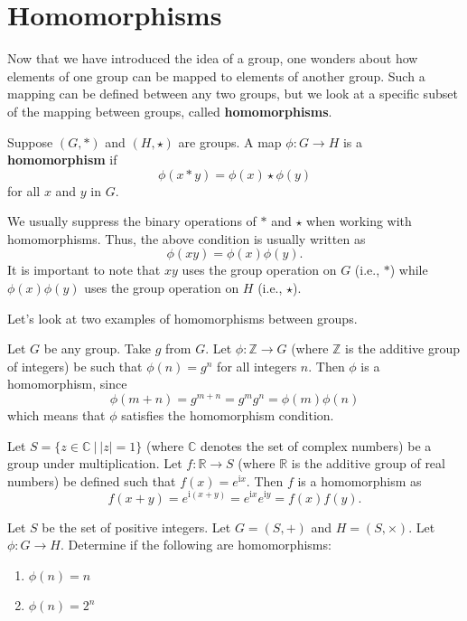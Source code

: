 \section{Homomorphisms}
Now that we have introduced the idea of a group, one wonders about how elements of one group can be mapped to elements of another group. Such a mapping can be defined between any two groups, but we look at a specific subset of the mapping between groups, called \textbf{homomorphisms}.

\begin{definition}
    Suppose $(G, \ast)$ and $(H, \star)$ are groups. A map $\phi: G \to H$ is a \textbf{homomorphism} if
    \[
        \phi(x \ast y) = \phi(x) \star \phi(y)
    \]
    for all $x$ and $y$ in $G$.
\end{definition}
\begin{remark}
    We usually suppress the binary operations of $\ast$ and $\star$ when working with homomorphisms. Thus, the above condition is usually written as
    \[
        \phi(xy) = \phi(x)\phi(y).
    \]
    It is important to note that $xy$ uses the group operation on $G$ (i.e., $\ast$) while $\phi(x)\phi(y)$ uses the group operation on $H$ (i.e., $\star$).
\end{remark}

Let's look at two examples of homomorphisms between groups.
\begin{example}
    Let $G$ be any group. Take $g$ from $G$. Let $\phi: \mathbb{Z} \to G$ (where $\mathbb{Z}$ is the additive group of integers) be such that $\phi(n) = g^n$ for all integers $n$. Then $\phi$ is a homomorphism, since
    \[
        \phi(m + n) = g^{m+n} = g^m g^n = \phi(m)\phi(n)
    \]
    which means that $\phi$ satisfies the homomorphism condition.
\end{example}

\begin{example}
    Let $S = \{z \in \mathbb{C} \ | \ |z| = 1\}$ (where $\mathbb{C}$ denotes the set of complex numbers) be a group under multiplication. Let $f: \mathbb{R} \to S$ (where $\mathbb{R}$ is the additive group of real numbers) be defined such that $f(x) = e^{\mathrm{i}x}$. Then $f$ is a homomorphism as
    \[
        f(x + y) = e^{\mathrm{i}(x+y)} = e^{\mathrm{i}x} e^{\mathrm{i}y} = f(x)f(y).
    \]
\end{example}

\begin{exercise}
    Let $S$ be the set of positive integers. Let $G = (S, +)$ and $H = (S, \times)$. Let $\phi: G \to H$. Determine if the following are homomorphisms:
    \begin{enumerate}[label=(\alph*)]
        \item $\phi(n) = n$
        \item $\phi(n) = 2^n$
    \end{enumerate}
\end{exercise}

